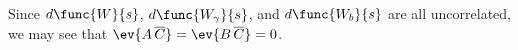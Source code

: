 Since $d\func{W}{s}$, $d\func{W_{\gamma}}{s}$, and $d\func{W_{b}}{s}$ are all uncorrelated, we may see that $\ev{A\,\overline{C}} = \ev{B\,\overline{C}} = 0$.